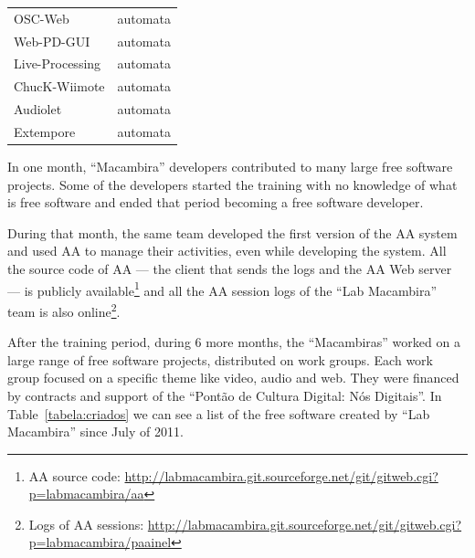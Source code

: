 \documentclass[letterpaper]{article}
\begin{document}
\begin{table}
\begin{center}
\begin{tabular}{|l|l|}
        OSC-Web               & automata                            \\
        Web-PD-GUI            & automata                            \\
        Live-Processing       & automata                            \\
        ChucK-Wiimote         & automata                            \\
        Audiolet              & automata                            \\
        Extempore             & automata                            \\
        \hline
\end{tabular}
\end{center}
    \label{tabela:contribuicoes}
\end{table}

In one month, ``Macambira'' developers contributed to many large free software
projects. Some of the developers started the training with no knowledge of what
is free software and ended that period becoming a free software developer.

During that month, the same team developed the first version of the AA system
and used AA to manage their activities, even while developing the system. All
the source code of AA --- the client that sends the logs and the AA Web server
--- is publicly available\footnote{AA source code:
  \url{http://labmacambira.git.sourceforge.net/git/gitweb.cgi?p=labmacambira/aa}}
and all the AA session logs of the ``Lab Macambira'' team is also
online\footnote{Logs of AA sessions:
  \url{http://labmacambira.git.sourceforge.net/git/gitweb.cgi?p=labmacambira/paainel}}.

After the training period, during 6 more months, the ``Macambiras'' worked on a
large range of free software projects, distributed on work groups. Each work
group focused on a specific theme like video, audio and web. They were financed by
contracts and support of the ``Pont\~{a}o de Cultura Digital: N\'{o}s Digitais''. In
Table~\ref{tabela:criados} we can see a list of the free software created by
``Lab Macambira'' since July of 2011.
\end{document}
